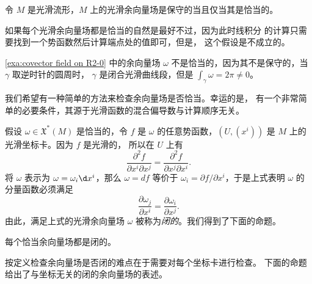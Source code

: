 \documentclass[fontset=none]{Notes}
\begin{document}
\begin{theorem}
  令 $M$ 是光滑流形，$M$ 上的光滑余向量场是保守的当且仅当其是恰当的。
\end{theorem}

如果每个光滑余向量场都是恰当的自然是最好不过，因为此时线积分
的计算只需要找到一个势函数然后计算端点处的值即可，但是，
这个假设是不成立的。

\begin{example}
  \autoref{exa:covector field on R2-0} 中的余向量场 $\omega$
  不是恰当的，因为其不是保守的，当 $\gamma$ 取逆时针的圆周时，
  $\gamma$ 是闭合光滑曲线段，但是 $\int_\gamma\omega=2\pi\neq 0$。
\end{example}

我们希望有一种简单的方法来检查余向量场是否恰当。幸运的是，
有一个非常简单的必要条件，其源于光滑函数的混合偏导数与计算顺序无关。

假设 $\omega\in \mathfrak{X}^*(M)$ 是恰当的，令 $f$ 是 $\omega$
的任意势函数，$(U,(x^i))$ 是 $M$ 上的光滑坐标卡。因为 $f$ 是光滑的，
所以在 $U$ 上有
\[
  \frac{\partial^2 f}{\partial x^i\partial x^j}=
  \frac{\partial^2 f}{\partial x^j\partial x^i} .
\]
将 $\omega$ 表示为 $\omega=\omega_i \d x^i$，那么 $\omega= df$
等价于 $\omega_i=\partial f/\partial x^i$，于是上式表明
$\omega$ 的分量函数必须满足
\begin{equation}\label{eq:close covector field}
  \frac{\partial \omega_j}{\partial x^i}=\frac{\partial\omega_i}{\partial x^j}.  
\end{equation}
由此，满足上式的光滑余向量场 $\omega$ 被称为\emph{闭的}。我们得到了下面的命题。

\begin{proposition}
  每个恰当余向量场都是闭的。
\end{proposition}

按定义检查余向量场是否闭的难点在于需要对每个坐标卡进行检查。
下面的命题给出了与坐标无关的闭的余向量场的表述。
\end{document}
